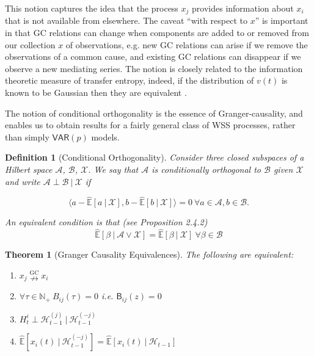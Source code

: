 \documentclass{statsoc}
\def\ngc{\overset{\text{GC}}{\nrightarrow}}  %
\def\VAR{\mathsf{VAR}}  %
\def\B{\mathsf{B}}  %
\def\H{\mathcal{H}}  %
\newcommand{\linE}[2]{\hat{\E}[#1\ |\ #2]}  %
\newtheorem{theorem}{Theorem}
\newtheorem{definition}{Definition}
\def\H{\mathcal{H}}  %
\def\E{\mathbb{E}}  %
\def\N{\mathbb{N}}  %
\newcommand{\inner}[2]{\langle #1, #2 \rangle}  %
\begin{document}
This notion captures the idea that the process $x_j$ provides
information about $x_i$ that is not available from elsewhere.  The
caveat ``with respect to $x$'' is important in that GC relations can
change when components are added to or removed from our collection $x$
of observations, e.g. new GC relations can arise if we remove the
observations of a common cause, and existing GC relations can
disappear if we observe a new mediating series. The notion is closely
related to the information theoretic measure of transfer entropy,
indeed, if the distribution of $v(t)$ is known to be Gaussian then
they are equivalent \cite{barnett2009granger}.

The notion of conditional orthogonality is the essence of
Granger-causality, and enables us to obtain results for a fairly
general class of WSS processes, rather than simply $\VAR(p)$ models.

\begin{definition}[Conditional Orthogonality]
  \label{lem:conditional_orthogonality_equivalence}
  Consider three closed subspaces of a Hilbert space $\mathcal{A}$,
  $\mathcal{B}$, $\mathcal{X}$.  We say that $\mathcal{A}$ is
  conditionally orthogonal to $\mathcal{B}$ given $\mathcal{X}$
  and write $\mathcal{A} \perp \mathcal{B}\ |\ \mathcal{X}$ if

    \begin{equation*}
      \inner{a - \linE{a}{\mathcal{X}}}{b - \linE{b}{\mathcal{X}}} = 0\ \forall a \in \mathcal{A}, b \in \mathcal{B}.
    \end{equation*}

  An equivalent condition is that (see \cite{lindquist} Proposition 2.4.2)
  \begin{equation*}
    \linE{\beta}{\mathcal{A} \vee \mathcal{X}} = \linE{\beta}{\mathcal{X}}\ \forall \beta \in \mathcal{B}
  \end{equation*}
\end{definition}

\begin{theorem}[Granger Causality Equivalences]
  \label{thm:granger_causality_equivalences}
  The following are equivalent:

  \begin{enumerate}
    \item{$x_j \ngc x_i$}
    \item{$\forall \tau \in \N_+\ B_{ij}(\tau) = 0$ i.e. $\B_{ij}(z) = 0$}
    \item{$H_t^{i} \perp \H_{t - 1}^{(j)}\ |\ \H_{t - 1}^{(-j)}$}
    \item{$\linE{x_i(t)}{\H_{t - 1}^{(-j)}} = \linE{x_i(t)}{\H_{t - 1}}$}
  \end{enumerate}
\end{theorem}
\end{document}
